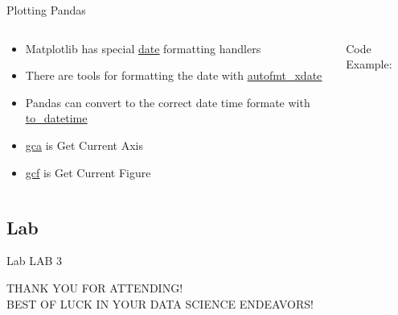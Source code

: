 % 
% 
% 
\begin{Slide}{Plotting Pandas}
  \begin{columns}
    \begin{column}{.48\textwidth}
      
      \begin{itemize}
      \item Matplotlib has special \underline{\href{https://matplotlib.org/stable/api/dates_api.html}{date}} formatting handlers
      \item There are tools for formatting the date with \underline{\href{https://matplotlib.org/stable/api/figure_api.html\#matplotlib.figure.Figure.autofmt_xdate}{autofmt\_xdate}} 
      \item Pandas can convert to the correct date time formate with \underline{\href{https://pandas.pydata.org/docs/reference/api/pandas.to_datetime.html}{to\_datetime}}
      \item \underline{\href{https://matplotlib.org/stable/api/_as_gen/matplotlib.pyplot.gca.html}{gca}} is Get Current Axis 
      \item \underline{\href{https://matplotlib.org/stable/api/_as_gen/matplotlib.pyplot.gcf.html}{gcf}} is Get Current Figure
      \end{itemize}
      
      
    \end{column}

    \hfill

    \begin{column}{.48\textwidth}
      Code Example:
      
    \inputminted[firstline=9,
      lastline=32,
      breaklines,
      fontsize=\tiny,
      bgcolor=Background,
      linenos]{python}{../src/data_plot.py}
      
      
    \end{column}
  \end{columns}

\end{Slide}

\subsection{Lab}
\begin{Slide}{Lab}
  LAB 3
  \pause
  
  \begin{tcolorbox}[colback=blue!25!white,colframe=blue!75!black,title=THANK YOU]
    THANK YOU FOR ATTENDING! \\
    BEST OF LUCK IN YOUR DATA SCIENCE ENDEAVORS!
  \end{tcolorbox}

\end{Slide}
